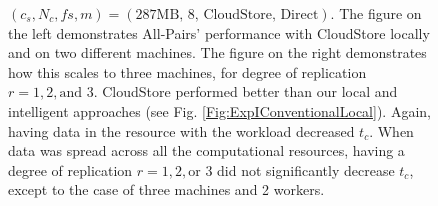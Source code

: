 \documentclass{rspublic}
\newcommand{\fixme}[1]{ { \bf{ ***FIXME: #1
}} } \newcommand{\jhanote}[1]{ {\textcolor{red} { ***Jha: #1 }}}
\newcommand{\micnote}[1]{ {\textcolor{blue} { ***Michael: #1 }}}
\newcommand{\betynote}[1]{ {\textcolor{orange} { ***Bety: #1 }}}
\newcommand{\jhanote}[1]{} \newcommand{\micnote}[1]{}\newcommand{\betynote}[1]{} \newcommand{\fixme}[1]{}
\begin{document}
\begin{figure}
\begin{center}
\caption{$(c_s, N_c, f\!s, m) = (\mbox{287MB, 8, CloudStore,
Direct})$. The figure on the left demonstrates All-Pairs' performance
with CloudStore locally and on two different machines. The figure on the
right demonstrates how this scales to three machines, for degree of
replication $r=1,2,\mbox{and } 3$. CloudStore performed better than our
local and intelligent approaches (see Fig.
\ref{Fig:ExpIConventionalLocal}). Again,
having data in the resource with the workload decreased $t_c$. When data
was spread across all the computational resources, having a degree of
replication $r = 1, 2, \mbox{or } 3$ did not significantly decrease
$t_c$, except to the case of three machines and 2 workers.}
\label{Fig:experiment3}
\end{center}
\vspace{-0.3cm}
\end{figure}
\end{document}
